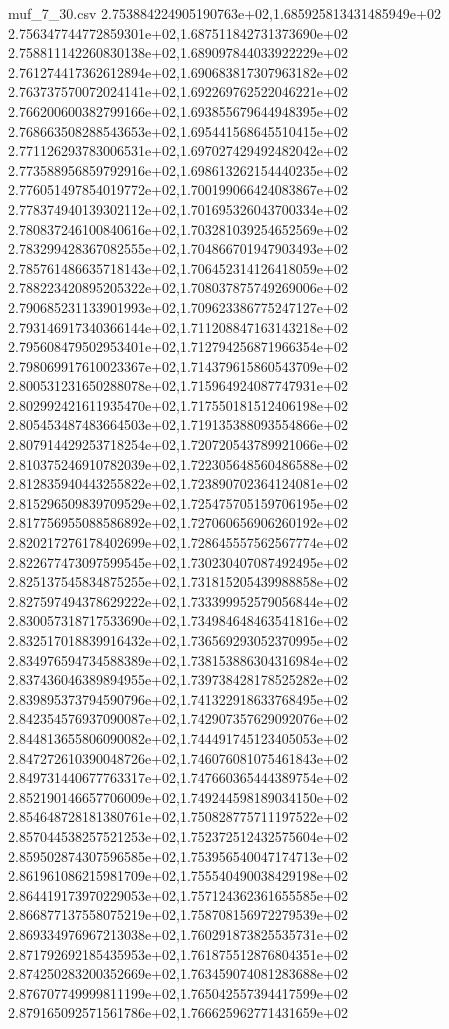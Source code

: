 \begin{filecontents*}{muf_7_30.csv}
2.753884224905190763e+02,1.685925813431485949e+02
2.756347744772859301e+02,1.687511842731373690e+02
2.758811142260830138e+02,1.689097844033922229e+02
2.761274417362612894e+02,1.690683817307963182e+02
2.763737570072024141e+02,1.692269762522046221e+02
2.766200600382799166e+02,1.693855679644948395e+02
2.768663508288543653e+02,1.695441568645510415e+02
2.771126293783006531e+02,1.697027429492482042e+02
2.773588956859792916e+02,1.698613262154440235e+02
2.776051497854019772e+02,1.700199066424083867e+02
2.778374940139302112e+02,1.701695326043700334e+02
2.780837246100840616e+02,1.703281039254652569e+02
2.783299428367082555e+02,1.704866701947903493e+02
2.785761486635718143e+02,1.706452314126418059e+02
2.788223420895205322e+02,1.708037875749269006e+02
2.790685231133901993e+02,1.709623386775247127e+02
2.793146917340366144e+02,1.711208847163143218e+02
2.795608479502953401e+02,1.712794256871966354e+02
2.798069917610023367e+02,1.714379615860543709e+02
2.800531231650288078e+02,1.715964924087747931e+02
2.802992421611935470e+02,1.717550181512406198e+02
2.805453487483664503e+02,1.719135388093554866e+02
2.807914429253718254e+02,1.720720543789921066e+02
2.810375246910782039e+02,1.722305648560486588e+02
2.812835940443255822e+02,1.723890702364124081e+02
2.815296509839709529e+02,1.725475705159706195e+02
2.817756955088586892e+02,1.727060656906260192e+02
2.820217276178402699e+02,1.728645557562567774e+02
2.822677473097599545e+02,1.730230407087492495e+02
2.825137545834875255e+02,1.731815205439988858e+02
2.827597494378629222e+02,1.733399952579056844e+02
2.830057318717533690e+02,1.734984648463541816e+02
2.832517018839916432e+02,1.736569293052370995e+02
2.834976594734588389e+02,1.738153886304316984e+02
2.837436046389894955e+02,1.739738428178525282e+02
2.839895373794590796e+02,1.741322918633768495e+02
2.842354576937090087e+02,1.742907357629092076e+02
2.844813655806090082e+02,1.744491745123405053e+02
2.847272610390048726e+02,1.746076081075461843e+02
2.849731440677763317e+02,1.747660365444389754e+02
2.852190146657706009e+02,1.749244598189034150e+02
2.854648728181380761e+02,1.750828775711197522e+02
2.857044538257521253e+02,1.752372512432575604e+02
2.859502874307596585e+02,1.753956540047174713e+02
2.861961086215981709e+02,1.755540490038429198e+02
2.864419173970229053e+02,1.757124362361655585e+02
2.866877137558075219e+02,1.758708156972279539e+02
2.869334976967213038e+02,1.760291873825535731e+02
2.871792692185435953e+02,1.761875512876804351e+02
2.874250283200352669e+02,1.763459074081283688e+02
2.876707749999811199e+02,1.765042557394417599e+02
2.879165092571561786e+02,1.766625962771431659e+02

\end{filecontents*}
